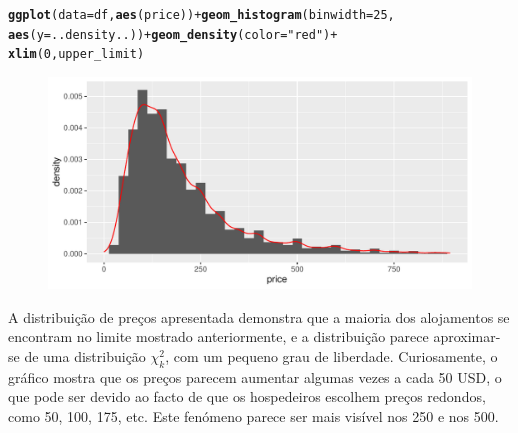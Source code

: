 \documentclass[justified, 11pt]{scrartcl}\usepackage[]{graphicx}\usepackage[]{xcolor}
\makeatletter
\def\maxwidth{ %
  \ifdim\Gin@nat@width>\linewidth
    \linewidth
  \else
    \Gin@nat@width
  \fi
}
\newcommand{\hlnum}[1]{\textcolor[rgb]{0.686,0.059,0.569}{#1}}%
\newcommand{\hlstr}[1]{\textcolor[rgb]{0.192,0.494,0.8}{#1}}%
\newcommand{\hlopt}[1]{\textcolor[rgb]{0,0,0}{#1}}%
\newcommand{\hlstd}[1]{\textcolor[rgb]{0.345,0.345,0.345}{#1}}%
\newcommand{\hlkwc}[1]{\textcolor[rgb]{0.333,0.667,0.333}{#1}}%
\newcommand{\hlkwd}[1]{\textcolor[rgb]{0.737,0.353,0.396}{\textbf{#1}}}%
\newenvironment{kframe}{%
 \def\at@end@of@kframe{}%
 \ifinner\ifhmode%
  \def\at@end@of@kframe{\end{minipage}}%
  \begin{minipage}{\columnwidth}%
 \fi\fi%
 \def\FrameCommand##1{\hskip\@totalleftmargin \hskip-\fboxsep
 \colorbox{shadecolor}{##1}\hskip-\fboxsep
     \hskip-\linewidth \hskip-\@totalleftmargin \hskip\columnwidth}%
 \MakeFramed {\advance\hsize-\width
   \@totalleftmargin\z@ \linewidth\hsize
   \@setminipage}}%
 {\par\unskip\endMakeFramed%
 \at@end@of@kframe}
\newenvironment{knitrout}{}{} %
\makeatother
\begin{document}
\begin{knitrout}
\color{fgcolor}\begin{kframe}
\begin{alltt}
\hlkwd{ggplot}\hlstd{(}\hlkwc{data} \hlstd{= df,} \hlkwd{aes}\hlstd{(price))} \hlopt{+} \hlkwd{geom_histogram}\hlstd{(}\hlkwc{binwidth} \hlstd{=} \hlnum{25}\hlstd{,}
    \hlkwd{aes}\hlstd{(}\hlkwc{y} \hlstd{= ..density..))} \hlopt{+} \hlkwd{geom_density}\hlstd{(}\hlkwc{color} \hlstd{=} \hlstr{"red"}\hlstd{)} \hlopt{+}
    \hlkwd{xlim}\hlstd{(}\hlnum{0}\hlstd{, upper_limit)}
\end{alltt}
\end{kframe}\begin{figure}
\includegraphics[width=\maxwidth]{figure/chunk-priceHist-1} \end{figure}

\end{knitrout}
A distribuição de preços apresentada demonstra que a maioria dos alojamentos se encontram no limite mostrado anteriormente, e a distribuição parece aproximar-se de uma distribuição $\chi_{k}^{2}$, com um pequeno grau de liberdade. Curiosamente, o gráfico mostra que os preços parecem aumentar algumas vezes a cada 50 USD, o que pode ser devido ao facto de que os hospedeiros escolhem preços redondos, como 50, 100, 175, etc. Este fenómeno parece ser mais visível nos 250 e nos 500.\\
\end{document}
